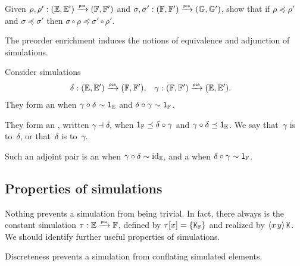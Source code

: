 \begin{exercise}
  Given $\rho, \rho' : (\EE, \subEE) \pcato (\FF, \subFF)$ and $\sigma, \sigma' : (\FF, \subFF) \pcato (\GG, \subGG)$, show that if $\rho \preceq \rho'$ and $\sigma \preceq \sigma'$ then $\sigma \circ \rho \preceq \sigma' \circ \rho'$.
\end{exercise}

The preorder enrichment induces the notions of equivalence and adjunction of simulations.

\goodbreak

\begin{definition}%
  Consider simulations
  \begin{align*}
    \delta &: (\EE, \subEE) \pcato (\FF, \subFF),
    &
    \gamma &: (\FF, \subFF) \pcato (\EE, \subEE).
  \end{align*}
  They form an  when $\gamma \circ \delta \sim \one_\EE$ and $\delta \circ \gamma \sim \one_\FF$.

  They form an , written $\gamma \dashv \delta$, when
  $\one_{\FF} \preceq \delta \circ \gamma$ and $\gamma \circ
  \delta \preceq \one_{\EE}$. We say that~$\gamma$ is  to~$\delta$, or that~$\delta$ is 
  to~$\gamma$.

  Such an adjoint pair is an  when $\gamma \circ \delta \sim \id[\EE]$, and a
   when $\delta \circ \gamma \sim \one_\FF$.
\end{definition}

\subsection{Properties of simulations}
\label{sec:prop-simul}

Nothing prevents a simulation from being trivial. In fact, there always is the constant simulation $\tau : \EE \pcato \FF$, defined by $\tau[x] = \set{\combK_{\FF}}$ and realized by $\pcalam{x\,y} \combK$. We should identify further useful properties of simulations.

Discreteness prevents a simulation from conflating simulated elements.

